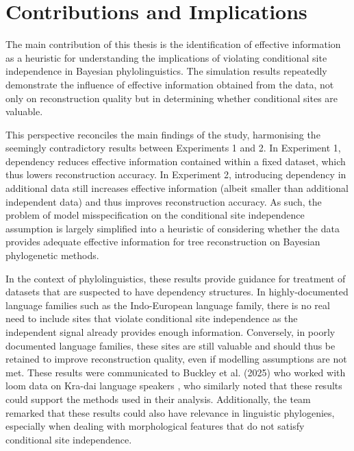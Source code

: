 \section{Contributions and Implications}
The main contribution of this thesis is the identification of effective information as a heuristic for understanding the implications of violating conditional site independence in Bayesian phylolinguistics. The simulation results repeatedly demonstrate the influence of effective information obtained from the data, not only on reconstruction quality but in determining whether conditional sites are valuable. 

This perspective reconciles the main findings of the study, harmonising the seemingly contradictory results between Experiments 1 and 2. In Experiment 1, dependency reduces effective information contained within a fixed dataset, which thus lowers reconstruction accuracy. In Experiment 2, introducing dependency in additional data still increases effective information (albeit smaller than additional independent data) and thus improves reconstruction accuracy. As such, the problem of model misspecification on the conditional site independence assumption is largely simplified into a heuristic of considering whether the data provides adequate effective information for tree reconstruction on Bayesian phylogenetic methods. 

In the context of phylolinguistics, these results provide guidance for treatment of datasets that are suspected to have dependency structures. In highly-documented language families such as the Indo-European language family, there is no real need to include sites that violate conditional site independence as the independent signal already provides enough information. Conversely, in poorly documented language families, these sites are still valuable and should thus be retained to improve reconstruction quality, even if modelling assumptions are not met. These results were communicated to Buckley et al. (2025) who worked with loom data on Kra-dai language speakers \cite{Buckley2025}, who similarly noted that these results could support the methods used in their analysis. Additionally, the team remarked that these results could also have relevance in linguistic phylogenies, especially when dealing with morphological features that do not satisfy conditional site independence. 

